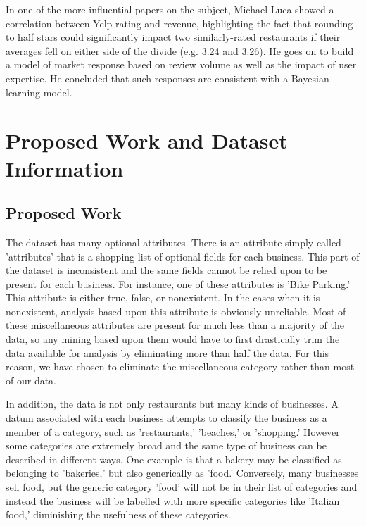 In one of the more influential papers on the subject, Michael Luca showed a correlation between Yelp rating and revenue, highlighting the fact that rounding to half stars could significantly impact two similarly-rated restaurants if their averages fell on either side of the divide (e.g. 3.24 and 3.26). He goes on to build a model of market response based on review volume as well as the impact of user expertise. He concluded that such responses are consistent with a Bayesian learning model.

\section{Proposed Work and Dataset Information}

\subsection{Proposed Work}

\quad The dataset has many optional attributes. There is an attribute simply called 'attributes' that is a shopping list of optional fields for each business. This part of the dataset is inconsistent and the same fields cannot be relied upon to be present for each business. For instance, one of these attributes is 'Bike Parking.' This attribute is either true, false, or nonexistent. In the cases when it is nonexistent, analysis based upon this attribute is obviously unreliable. Most of these miscellaneous attributes are present for much less than a majority of the data, so any mining based upon them would have to first drastically trim the data available for analysis by eliminating more than half the data. For this reason, we have chosen to eliminate the miscellaneous category rather than most of our data.

\quad In addition, the data is not only restaurants but many kinds of businesses. A datum associated with each business attempts to classify the business as a member of a category, such as 'restaurants,' 'beaches,' or 'shopping.' However some categories are extremely broad and the same type of business can be described in different ways. One example is that a bakery may be classified as belonging to 'bakeries,' but also generically as 'food.' Conversely, many businesses sell food, but the generic category 'food' will not be in their list of categories and instead the business will be labelled with more specific categories like 'Italian food,' diminishing the usefulness of these categories.

